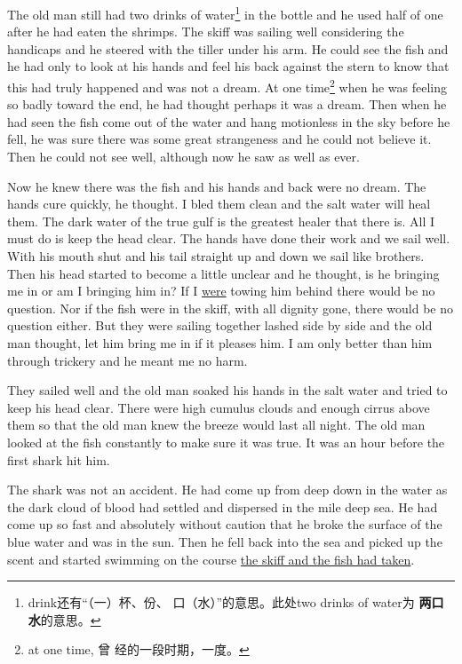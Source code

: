 \documentclass[fontset=ubuntu,zihao=-4]{ctexrep}
\begin{document}
The old man still had two drinks of water\footnote{drink还有“（一）杯、份、
  口（水）”的意思。此处two drinks of water为 \textbf{两口水}的意思。} in
the bottle and he used half of one after he had eaten the shrimps. The skiff
was sailing well considering the \glspl{handicap} and he \gls{steered}
with the \gls{tiller} under his arm. He could see the fish and he had only
to look at his hands and feel his back against the stern to know that this
had truly happened and was not a dream. At one time\footnote{at one time, 曾
  经的一段时期，一度。} when he was feeling so badly toward the end, he had
thought perhaps it was a dream. Then when he had seen the fish come out of
the water and hang \gls{motionless} in the sky before he fell, he was sure
there was some great \gls{strangeness} and he could not believe it. Then
he could not see well, although now he saw as well as ever.

Now he knew there was the fish and his hands and back were no dream. The
hands \gls{cure} quickly, he thought. I \gls{bled} them clean and the
salt water will \gls{heal} them. The dark water of the true gulf is the
greatest \gls{healer} that there is. All I must do is keep the head clear.
The hands have done their work and we sail well. With his mouth shut and his
tail straight up and down we sail like brothers. Then his head started to
become a little unclear and he thought, is he bringing me in or am I
bringing him in? If I \uline{were} \gls{towing} him behind there would be no
question. Nor if the fish were in the skiff, with all dignity gone, there
would be no question either. But they were sailing together lashed side by
side and the old man thought, let him bring me in if it pleases him. I am
only better than him through \gls{trickery} and he meant me no \gls{harm}.

They sailed well and the old man \gls{soaked} his hands in the salt water
and tried to keep his head clear. There were high cumulus clouds and enough
cirrus above them so that the old man knew the breeze would last all night.
The old man looked at the fish \gls{constantly} to make sure it was true.
It was an hour before the first shark hit him.

The shark was not an \gls{accident}. He had come up from deep down in the
water as the dark cloud of blood had settled and \gls{dispersed} in the mile
deep sea. He had come up so fast and absolutely without \gls{caution} that
he broke the surface of the blue water and was in the sun. Then he fell back
into the sea and picked up the scent and started swimming on the course \uline{the
skiff and the fish had taken}.
\end{document}
